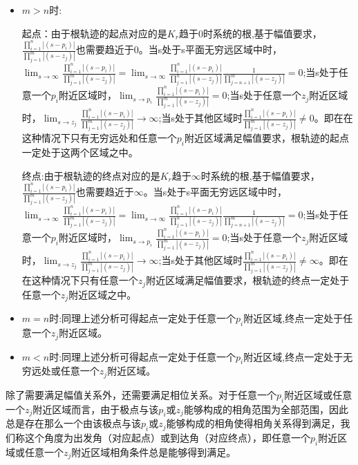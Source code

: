 \documentclass{article}
\numberwithin{equation}{section}
\numberwithin{figure}{section}
\begin{document}
\begin{itemize}
    \item $m>n$时:
    
    起点：由于根轨迹的起点对应的是$K_r$趋于0时系统的根,基于幅值要求，$\frac{\prod_{i=1}^{n}|(s-p_i)|}{\prod_{j=1}^{m}|(s-z_j)|}$也需要趋近于0。当s处于s平面无穷远区域中时，$\lim_{s\rightarrow \infty}\frac{\prod_{i=1}^{n}|(s-p_i)|}{\prod_{j=1}^{m}|(s-z_j)|}=\lim_{s\rightarrow \infty}\frac{\prod_{i=1}^{n}|(s-p_i)|}{\prod_{j=1}^{n}|(s-z_j)|}\frac{1}{\prod_{j=n+1}^{m}|(s-z_j)|}=0$;当s处于任意一个$p_i$附近区域时，$\lim_{s\rightarrow p_i}\frac{\prod_{i=1}^{n}|(s-p_i)|}{\prod_{j=1}^{m}|(s-z_j)|}=0$;当s处于任意一个$z_j$附近区域时，$\lim_{s\rightarrow z_j}\frac{\prod_{i=1}^{n}|(s-p_i)|}{\prod_{j=1}^{m}|(s-z_j)|}\rightarrow \infty$;当s处于其他区域时$\frac{\prod_{i=1}^{n}|(s-p_i)|}{\prod_{j=1}^{m}|(s-z_j)|}\neq 0$。即在在这种情况下只有无穷远处和任意一个$p_i$附近区域满足幅值要求，根轨迹的起点一定处于这两个区域之中。

    终点:由于根轨迹的终点对应的是$K_r$趋于$\infty$时系统的根,基于幅值要求，$\frac{\prod_{i=1}^{n}|(s-p_i)|}{\prod_{j=1}^{m}|(s-z_j)|}$也需要趋近于$\infty$。当s处于s平面无穷远区域中时，$\lim_{s\rightarrow \infty}\frac{\prod_{i=1}^{n}|(s-p_i)|}{\prod_{j=1}^{m}|(s-z_j)|}=\lim_{s\rightarrow \infty}\frac{\prod_{i=1}^{n}|(s-p_i)|}{\prod_{j=1}^{n}|(s-z_j)|}\frac{1}{\prod_{j=n+1}^{m}|(s-z_j)|}=0$;当s处于任意一个$p_i$附近区域时，$\lim_{s\rightarrow p_i}\frac{\prod_{i=1}^{n}|(s-p_i)|}{\prod_{j=1}^{m}|(s-z_j)|}=0$;当s处于任意一个$z_j$附近区域时，$\lim_{s\rightarrow z_j}\frac{\prod_{i=1}^{n}|(s-p_i)|}{\prod_{j=1}^{m}|(s-z_j)|}\rightarrow \infty$;当s处于其他区域时$\frac{\prod_{i=1}^{n}|(s-p_i)|}{\prod_{j=1}^{m}|(s-z_j)|} \neq \infty$。即在在这种情况下只有任意一个$z_j$附近区域满足幅值要求，根轨迹的终点一定处于任意一个$z_j$附近区域之中。
    \item $m=n$时:同理上述分析可得起点一定处于任意一个$p_i$附近区域,终点一定处于任意一个$z_j$附近区域。
    \item $m<n$时:同理上述分析可得起点一定处于任意一个$p_i$附近区域,终点一定处于无穷远处或任意一个$z_j$附近区域。
\end{itemize}

除了需要满足幅值关系外，还需要满足相位关系。对于任意一个$p_i$附近区域或任意一个$z_j$附近区域而言，由于极点与该$p_i$或$z_j$能够构成的相角范围为全部范围，因此总是存在那么一个由该极点与该$p_i$或$z_j$能够构成的相角使得相角关系得到满足，我们称这个角度为出发角（对应起点）或到达角（对应终点），即任意一个$p_i$附近区域或任意一个$z_j$附近区域相角条件总是能够得到满足。
\end{document}
